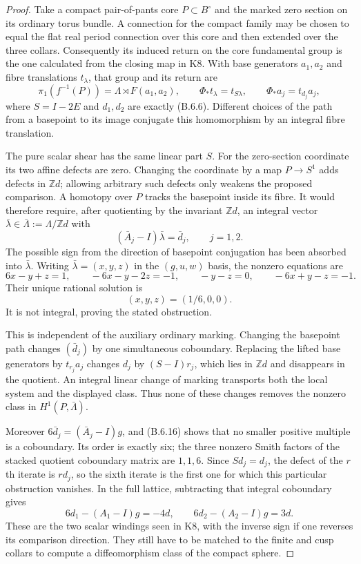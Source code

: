 \begin{proof}
Take a compact pair-of-pants core $P\subset B^\circ$ and the
marked zero section on its ordinary torus bundle. A connection
for the compact family may be chosen to equal the flat real
period connection over this core and then extended over the
three collars. Consequently its induced return on the core
fundamental group is the one calculated from the closing map
in K8. With base generators $a_1,a_2$ and fibre translations
$t_\lambda$, that group and its return are
\[
 \pi_1(f^{-1}(P))=\Lambda\rtimes F(a_1,a_2),\qquad
 \Phi_*t_\lambda=t_{S\lambda},\qquad
 \Phi_*a_j=t_{d_j}a_j,
\]
where $S=I-2E$ and $d_1,d_2$ are exactly (B.6.6).
Different choices of the path from a basepoint to its image
conjugate this homomorphism by an integral fibre translation.

The pure scalar shear has the same linear part $S$.
For the zero-section coordinate its two affine defects are
zero. Changing the coordinate by a map $P\to S^1$ adds
defects in $\mathbb Z d$; allowing arbitrary such defects
only weakens the proposed comparison. A homotopy over $P$
tracks the basepoint inside its fibre. It would therefore
require, after quotienting by the invariant $\mathbb Z d$,
an integral vector $\bar\lambda\in\bar\Lambda:=\Lambda/\mathbb Z d$
with
\[
 (\bar A_j-I)\bar\lambda=\bar d_j,\qquad j=1,2.
 \tag{B.6.15}
\]
The possible sign from the direction of basepoint conjugation
has been absorbed into $\bar\lambda$.
Writing $\bar\lambda=(x,y,z)$ in the $(g,u,w)$ basis,
the nonzero equations are
\[
 6x-y+z=1,\qquad -6x-y-2z=-1,\qquad
 -y-z=0,\qquad -6x+y-z=-1.
\]
Their unique rational solution is
\[
 (x,y,z)=(1/6,0,0).
 \tag{B.6.16}
\]
It is not integral, proving the stated obstruction.

This is independent of the auxiliary ordinary marking.
Changing the basepoint path changes $(\bar d_j)$ by one
simultaneous coboundary. Replacing the lifted base generators
by $t_{r_j}a_j$ changes $d_j$ by $(S-I)r_j$, which lies in
$\mathbb Z d$ and disappears in the quotient. An integral
linear change of marking transports both the local system
and the displayed class. Thus none of these changes removes
the nonzero class in $H^1(P,\bar\Lambda)$.

Moreover $6\bar d_j=(\bar A_j-I)g$, and (B.6.16) shows
that no smaller positive multiple is a coboundary. Its
order is exactly six; the three nonzero Smith factors of
the stacked quotient coboundary matrix are $1,1,6$.
Since $Sd_j=d_j$, the defect of the $r$th iterate is $rd_j$,
so the sixth iterate is the first one for which this
particular obstruction vanishes. In the full lattice,
subtracting that integral coboundary gives
\[
 6d_1-(A_1-I)g=-4d,\qquad
 6d_2-(A_2-I)g=3d.
 \tag{B.6.17}
\]
These are the two scalar windings seen in K8, with the
inverse sign if one reverses its comparison direction.
They still have to be matched to the finite and cusp collars
to compute a diffeomorphism class of the compact sphere.


\end{proof}
